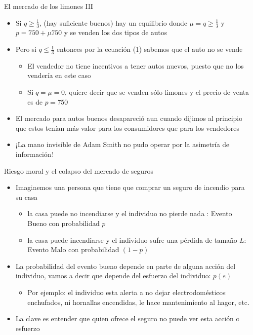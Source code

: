 \documentclass{beamer}
\begin{document}
\begin{frame}{El mercado de los limones III}
\begin{itemize}
    \item  Si $ q \geq \frac{1}{3}$, (hay suficiente buenos) hay un equilibrio donde $\mu = q \geq \frac{1}{3}$ y $p= 750 + \mu 750$ y se venden los dos tipos de autos 
    \vspace{1mm}
    \item Pero si $q \leq \frac{1}{3}$ entonces por la ecuación (1) sabemos que el auto no se vende
    \begin{itemize}
    \item El vendedor no tiene incentivos a tener autos nuevos, puesto que no los vendería en este caso
    \item Si $q= \mu = 0 $, quiere decir que se venden sólo limones y el precio de venta es de $p= 750$ 
    \end{itemize}
    \item El mercado para autos buenos desapareció aun cuando dijimos al principio que estos tenían más valor para los consumidores que para los vendedores \vspace{1mm}
    \item ¡La mano invisible de Adam Smith no pudo operar por la asimetría de información!
\end{itemize} 
\end{frame}

\begin{frame}{Riesgo moral y el colapso del mercado de seguros}
 \begin{itemize}
    \item Imaginemos una persona que tiene que comprar un seguro de incendio para su casa
    \begin{itemize}
    \item la casa puede no incendiarse y el individuo no pierde nada : Evento Bueno con probabilidad $p$
    \item la casa puede incendiarse y el individuo sufre una pérdida de tamaño $L$: Evento Malo con probabilidad $(1-p)$ 
    \end{itemize}
    \vspace{1mm}
    \item La probabilidad del evento bueno depende en parte de alguna acción del individuo, vamos a decir que depende del esfuerzo del individuo: $p(e)$
    \begin{itemize}
    \item Por ejemplo: el individuo esta alerta a no dejar electrodomésticos enchufados, ni hornallas encendidas, le hace mantenimiento al hagor, etc.
    \end{itemize}
    \item La clave es entender que quien ofrece el seguro no puede ver esta acción o esfuerzo
\end{itemize}
\end{frame}
\end{document}
